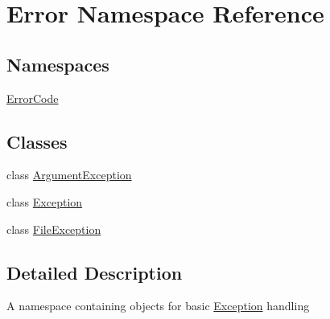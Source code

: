 \hypertarget{namespace_error}{}\section{Error Namespace Reference}
\label{namespace_error}
\subsection*{Namespaces}
\begin{DoxyCompactItemize}
\item 
 \hyperlink{namespace_error_1_1_error_code}{Error\+Code}
\end{DoxyCompactItemize}
\subsection*{Classes}
\begin{DoxyCompactItemize}
\item 
class \hyperlink{class_error_1_1_argument_exception}{Argument\+Exception}
\item 
class \hyperlink{class_error_1_1_exception}{Exception}
\item 
class \hyperlink{class_error_1_1_file_exception}{File\+Exception}
\end{DoxyCompactItemize}


\subsection{Detailed Description}
A namespace containing objects for basic \hyperlink{class_error_1_1_exception}{Exception} handling 